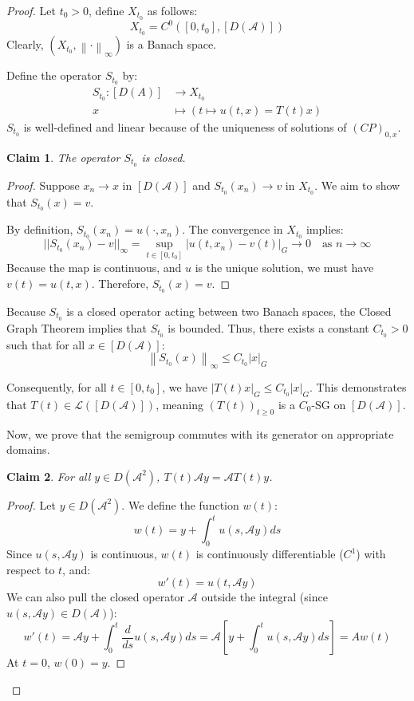 \documentclass[12pt, oneside]{book}
\newtheorem{claim}{Claim}[section]
\newcommand{\norm}[1]{\left\lVert#1\right\rVert}
\newcommand{\A}{\mathscr{A}}
\begin{document}
\begin{proof}
Let $t_0 > 0$, define $X_{t_0}$ as follows:
$$
X_{t_0} = C^0([0, t_0], [D(\A)])
$$
Clearly, $(X_{t_0}, \norm{\cdot}_{\infty})$ is a Banach space.

Define the operator $S_{t_0}$ by:
\begin{align*}
	S_{t_0}: [D(A)] &\to X_{t_0} \\
	x &\mapsto (t \mapsto u(t,x) = T(t)x)
\end{align*}
$S_{t_0}$ is well-defined and linear because of the uniqueness of solutions of $(CP)_{0,x}$.

\begin{claim}
    The operator $S_{t_0}$ is closed.
\end{claim}

\begin{proof}
    Suppose $x_n \to x$ in $[D(\A)]$ and $S_{t_0}(x_n) \to v$ in $X_{t_0}$. We aim to show that $S_{t_0}(x) = v$.

    By definition, $S_{t_0}(x_n) = u(\cdot, x_n)$. The convergence in $X_{t_0}$ implies:
    $$ ||S_{t_0}(x_n) - v||_{\infty} = \sup_{t \in [0, t_0]} |u(t, x_n) - v(t)|_G \to 0 \quad \text{as } n \to \infty $$
    Because the map is continuous, and $u$ is the unique solution, we must have $v(t) = u(t,x)$. Therefore, $S_{t_0}(x) = v$.
\end{proof}

Because $S_{t_0}$ is a closed operator acting between two Banach spaces, the Closed Graph Theorem implies that $S_{t_0}$ is bounded. Thus, there exists a constant $C_{t_0} > 0$ such that for all $x \in [D(\A)]$:
$$ \norm{S_{t_0}(x)}_{\infty} \le C_{t_0} |x|_G $$

Consequently, for all $t \in [0, t_0]$, we have $|T(t)x|_G \le C_{t_0} |x|_G$. This demonstrates that ${T(t) \in \mathcal{L}([D(\A)])}$, meaning $\left(T(t)\right)_{t \ge 0}$ is a $C_0$-SG on $[D(\A)]$.

Now, we prove that the semigroup commutes with its generator on appropriate domains.

\begin{claim}
    For all $y \in D(\A^2)$, $T(t)\A y = \A T(t)y$.
\end{claim}

\begin{proof}
    Let $y \in D(\A^2)$. We define the function $w(t)$:
    $$
    w(t) = y + \int_0^t u(s, \A y) ds
    $$
    Since $u(s, \A y)$ is continuous, $w(t)$ is continuously differentiable ($C^1$) with respect to $t$, and:
    $$ w'(t) = u(t, \A y) $$
    We can also pull the closed operator $\A$ outside the integral (since $u(s, \A y) \in D(\A)$):
    $$
    w'(t) = \A y + \int_0^t \frac{d}{ds} u(s, \A y) ds = \A \left[ y + \int_0^t u(s, \A y) ds \right] = Aw(t)
    $$
    At $t=0$, $w(0) = y$.
    

\end{proof}
\end{proof}
\end{document}
